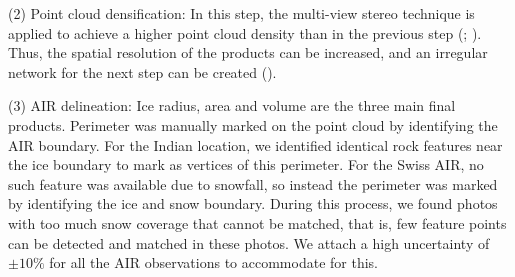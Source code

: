 \documentclass[utf8]{frontiersSCNS} %
\begin{document}
(2) Point cloud densification: In this step, the multi-view stereo technique is applied to achieve a higher point
cloud density than in the previous step (\cite{Furukawa_2010}; \cite{Molg_2017}). Thus, the spatial resolution of
the products can be increased, and an irregular network for the next step can be created (\cite{Kung_2011}).

(3) AIR delineation: Ice radius, area and volume are the three main final products. Perimeter was manually marked
on the point cloud by identifying the AIR boundary. For the Indian location, we identified identical rock features
near the ice boundary to mark as vertices of this perimeter. For the Swiss AIR, no such feature was available due
to snowfall, so instead the perimeter was marked by identifying the ice and snow boundary. During this process, we
found photos with too much snow coverage that cannot be matched, that is, few feature points can be detected and
matched in these photos. We attach a high uncertainty of $\pm 10 \%$ for all the AIR observations to accommodate
for this.
\end{document}
